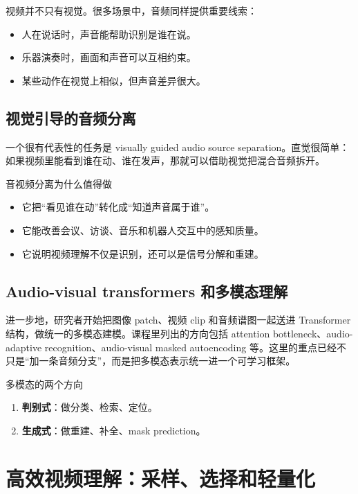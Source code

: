 \documentclass[a4paper]{article}
\begin{document}
视频并不只有视觉。很多场景中，音频同样提供重要线索：

\begin{itemize}
    \item 人在说话时，声音能帮助识别是谁在说。
    \item 乐器演奏时，画面和声音可以互相约束。
    \item 某些动作在视觉上相似，但声音差异很大。
\end{itemize}

\subsection{视觉引导的音频分离}

一个很有代表性的任务是 visually guided audio source separation。直觉很简单：如果视频里能看到谁在动、谁在发声，那就可以借助视觉把混合音频拆开。

\begin{knowledgebox}{音视频分离为什么值得做}
\begin{itemize}
    \item 它把“看见谁在动”转化成“知道声音属于谁”。
    \item 它能改善会议、访谈、音乐和机器人交互中的感知质量。
    \item 它说明视频理解不仅是识别，还可以是信号分解和重建。
\end{itemize}
\end{knowledgebox}

\subsection{Audio-visual transformers 和多模态理解}

进一步地，研究者开始把图像 patch、视频 clip 和音频谱图一起送进 Transformer 结构，做统一的多模态建模。课程里列出的方向包括 attention bottleneck、audio-adaptive recognition、audio-visual masked autoencoding 等。这里的重点已经不只是“加一条音频分支”，而是把多模态表示统一进一个可学习框架。

\begin{importantbox}{多模态的两个方向}
\begin{enumerate}
    \item \textbf{判别式}：做分类、检索、定位。
    \item \textbf{生成式}：做重建、补全、mask prediction。
\end{enumerate}
\end{importantbox}

\section{高效视频理解：采样、选择和轻量化}
\end{document}
